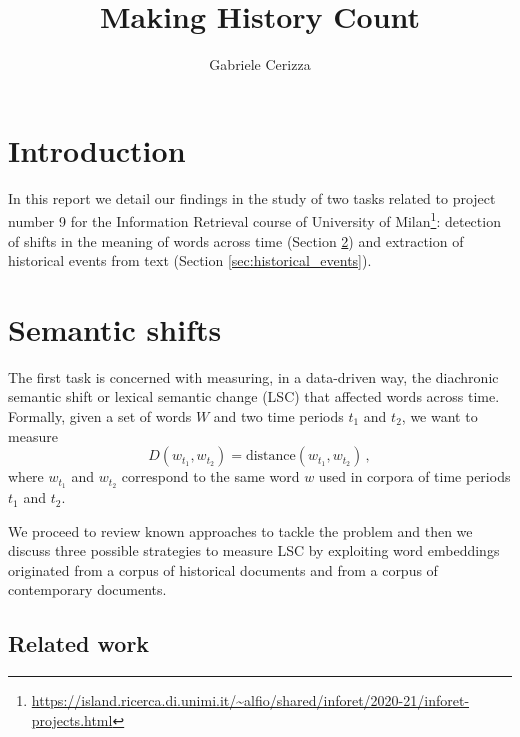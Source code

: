 \documentclass[runningheads]{llncs}
\begin{document}
\title{
    Making History Count
}
\author{Gabriele Cerizza}


\maketitle

\section{Introduction}
\label{sec:introduction}

In this report we detail our findings in the study of two tasks related to project number 9 for the Information Retrieval course of University of Milan\footnote{\url{https://island.ricerca.di.unimi.it/\~alfio/shared/inforet/2020-21/inforet-projects.html}}: detection of shifts in the meaning of words across time (Section \ref{sec:semantic_shifts}) and extraction of historical events from text (Section \ref{sec:historical_events}).

\section{Semantic shifts}
\label{sec:semantic_shifts}

The first task is concerned with measuring, in a data-driven way, the diachronic semantic shift or lexical semantic change (LSC) that affected words across time. Formally, given a set of words $W$ and two time periods $t_1$ and $t_2$, we want to measure
\begin{equation}
    D(w_{t_1}, w_{t_2}) = \text{distance}(w_{t_1}, w_{t_2}) \,,
\end{equation}
where $w_{t_1}$ and $w_{t_2}$ correspond to the same word $w$ used in corpora of time periods $t_1$ and $t_2$.

We proceed to review known approaches to tackle the problem and then we discuss three possible strategies to measure LSC by exploiting word embeddings originated from a corpus of historical documents and from a corpus of contemporary documents.

\subsection{Related work}
\label{subsec:semantic_shifts:related_work}
\end{document}
